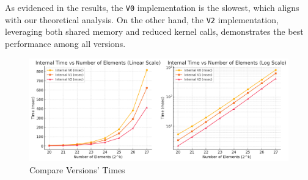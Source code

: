 \documentclass[12pt]{article}
\begin{document}
As evidenced in the results, the \texttt{V0} implementation is the slowest, which aligns with our theoretical analysis. On the other hand, the \texttt{V2} implementation, leveraging both shared memory and reduced kernel calls, demonstrates the best performance among all versions.

\begin{figure}[!h]
    \centering
    \includegraphics[width=1\linewidth]{plots/plot3_v0_v1_v2.png}
    \caption{Compare Versions' Times}
\end{figure}

\newpage
\end{document}
